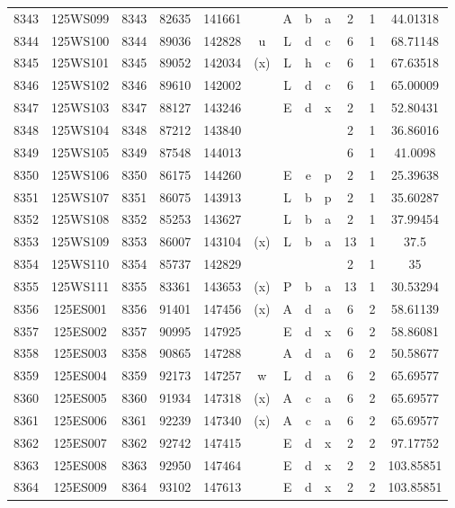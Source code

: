 \begin{tabular}{|*{12}{c|}}
8343 & 125WS099 & 8343 & 82635 & 141661 &  & A & b & a & 2 & 1 & 44.01318 \\ 
8344 & 125WS100 & 8344 & 89036 & 142828 & u & L & d & c & 6 & 1 & 68.71148 \\ 
8345 & 125WS101 & 8345 & 89052 & 142034 & (x) & L & h & c & 6 & 1 & 67.63518 \\ 
8346 & 125WS102 & 8346 & 89610 & 142002 &  & L & d & c & 6 & 1 & 65.00009 \\ 
8347 & 125WS103 & 8347 & 88127 & 143246 &  & E & d & x & 2 & 1 & 52.80431 \\ 
8348 & 125WS104 & 8348 & 87212 & 143840 &  &  &  &  & 2 & 1 & 36.86016 \\ 
8349 & 125WS105 & 8349 & 87548 & 144013 &  &  &  &  & 6 & 1 & 41.0098 \\ 
8350 & 125WS106 & 8350 & 86175 & 144260 &  & E & e & p & 2 & 1 & 25.39638 \\ 
8351 & 125WS107 & 8351 & 86075 & 143913 &  & L & b & p & 2 & 1 & 35.60287 \\ 
8352 & 125WS108 & 8352 & 85253 & 143627 &  & L & b & a & 2 & 1 & 37.99454 \\ 
8353 & 125WS109 & 8353 & 86007 & 143104 & (x) & L & b & a & 13 & 1 & 37.5 \\ 
8354 & 125WS110 & 8354 & 85737 & 142829 &  &  &  &  & 2 & 1 & 35 \\ 
8355 & 125WS111 & 8355 & 83361 & 143653 & (x) & P & b & a & 13 & 1 & 30.53294 \\ 
8356 & 125ES001 & 8356 & 91401 & 147456 & (x) & A & d & a & 6 & 2 & 58.61139 \\ 
8357 & 125ES002 & 8357 & 90995 & 147925 &  & E & d & x & 6 & 2 & 58.86081 \\ 
8358 & 125ES003 & 8358 & 90865 & 147288 &  & A & d & a & 6 & 2 & 50.58677 \\ 
8359 & 125ES004 & 8359 & 92173 & 147257 & w & L & d & a & 6 & 2 & 65.69577 \\ 
8360 & 125ES005 & 8360 & 91934 & 147318 & (x) & A & c & a & 6 & 2 & 65.69577 \\ 
8361 & 125ES006 & 8361 & 92239 & 147340 & (x) & A & c & a & 6 & 2 & 65.69577 \\ 
8362 & 125ES007 & 8362 & 92742 & 147415 &  & E & d & x & 2 & 2 & 97.17752 \\ 
8363 & 125ES008 & 8363 & 92950 & 147464 &  & E & d & x & 2 & 2 & 103.85851 \\ 
8364 & 125ES009 & 8364 & 93102 & 147613 &  & E & d & x & 2 & 2 & 103.85851 \\ 

\end{tabular}
